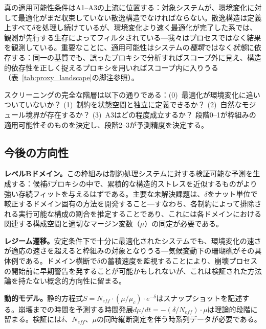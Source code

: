 \documentclass[11pt,a4paper]{article}
\begin{document}
真の適用可能性条件はA1--A3の上流に位置する：対象システムが、環境変化に対して最適化がまだ収束していない散逸構造でなければならない。散逸構造は定義上すべて$\delta$を処理し続けているが、環境変化より速く最適化が完了した系では、観測が先行する生存によってフィルタされている---我々はプロセスではなく結果を観測している。重要なことに、適用可能性はシステムの\emph{種類}ではなく\emph{状態}に依存する：同一の基質でも、誤ったプロキシで分析すればスコープ外に見え、構造的依存性を正しく捉えるプロキシを用いればスコープ内に入りうる（表~\ref{tab:proxy_landscape}の脚注参照）。

スクリーニングの完全な階層は以下の通りである：(0)~最適化が環境変化に追いついていないか？ (1)~制約を状態空間と独立に定義できるか？ (2)~自然なモジュール境界が存在するか？ (3)~A3はどの程度成立するか？ 段階0--1が枠組みの適用可能性そのものを決定し、段階2--3が予測精度を決定する。

\subsection{今後の方向性}

\textbf{レベルBドメイン。}この枠組みは制約処理システムに対する検証可能な予測を生成する：候補$\delta$プロキシの中で、累積的な構造的ストレスを近似するものがより強い存続フィットを与えるはずである。主要な未解決課題は、$\delta$をナット単位で較正するドメイン固有の方法を開発すること---すなわち、各制約によって排除される実行可能な構成の割合を推定することであり、これには各ドメインにおける関連する構成空間と適切なマージン変数（$\mu$）の同定が必要である。

\textbf{レジーム遷移。}安定条件下で十分に最適化されたシステムでも、環境変化の速さが適応の速さを超えると枠組みの対象となりうる---気候変動下の珊瑚礁がその具体例である。ドメイン横断で$\delta$の蓄積速度を監視することにより、崩壊プロセスの開始前に早期警告を発することが可能かもしれないが、これは検証された方法論を持たない概念的方向性に留まる。

\textbf{動的モデル。}静的方程式$S = N_{eff} \cdot (\mu/\mu_c) \cdot e^{-\delta}$はスナップショットを記述する。崩壊までの時間を予測する時間発展$d\mu/dt = -(\delta/N_{eff}) \cdot \mu$は理論的段階に留まる。検証には$\delta$、$N_{eff}$、$\mu$の同時縦断測定を伴う時系列データが必要である。
\end{document}
